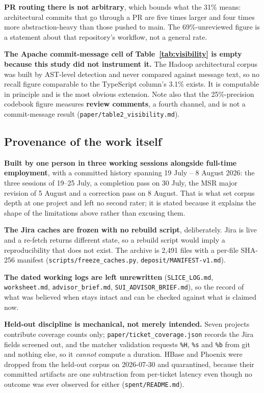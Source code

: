 \documentclass[11pt,a4paper]{article}
\begin{document}
\textbf{PR routing there is not arbitrary}, which bounds what the 31\% means: architectural commits that go through a PR are five times larger and four times more abstraction-heavy than those pushed to main. The 69\%-unreviewed figure is a statement about that repository's workflow, not a general rate.

\textbf{The Apache commit-message cell of Table~\ref{tab:visibility} is empty because this study did not instrument it.} The Hadoop architectural corpus was built by AST-level detection and never compared against message text, so no recall figure comparable to the TypeScript column's 3.1\% exists. It is computable in principle and is the most obvious extension. Note also that the 25\%-precision codebook figure measures \textbf{review comments}, a fourth channel, and is not a commit-message result (\texttt{paper/\allowbreak{}table2\_\allowbreak{}visibility.\allowbreak{}md}).

\subsection{Provenance of the work itself}
\label{sec:6.8}

\textbf{Built by one person in three working sessions alongside full-time employment}, with a committed history spanning 19 July -- 8 August 2026: the three sessions of 19--25 July, a completion pass on 30 July, the MSR major revision of 5 August and a correction pass on 8 August. That is what set corpus depth at one project and left no second rater; it is stated because it explains the shape of the limitations above rather than excusing them.

\textbf{The Jira caches are frozen with no rebuild script}, deliberately. Jira is live and a re-fetch returns different state, so a rebuild script would imply a reproducibility that does not exist. The archive is 2,491 files with a per-file SHA-256 manifest (\texttt{scripts/\allowbreak{}freeze\_\allowbreak{}caches.\allowbreak{}py}, \texttt{deposit/\allowbreak{}MANIFEST-\allowbreak{}v1.\allowbreak{}md}).

\textbf{The dated working logs are left unrewritten} (\texttt{SLICE\_\allowbreak{}LOG.\allowbreak{}md}, \texttt{worksheet.\allowbreak{}md}, \texttt{advisor\_\allowbreak{}brief.\allowbreak{}md}, \texttt{SUI\_\allowbreak{}ADVISOR\_\allowbreak{}BRIEF.\allowbreak{}md}), so the record of what was believed when stays intact and can be checked against what is claimed now.

\textbf{Held-out discipline is mechanical, not merely intended.} Seven projects contribute coverage counts only; \texttt{paper/\allowbreak{}ticket\_\allowbreak{}coverage.\allowbreak{}json} records the Jira fields screened out, and the matcher validation requests \texttt{\%H}, \texttt{\%s} and \texttt{\%b} from git and nothing else, so it \emph{cannot} compute a duration. HBase and Phoenix were dropped from the held-out corpus on 2026-07-30 and quarantined, because their committed artifacts are one subtraction from per-ticket latency even though no outcome was ever observed for either (\texttt{spent/\allowbreak{}README.\allowbreak{}md}).
\end{document}
